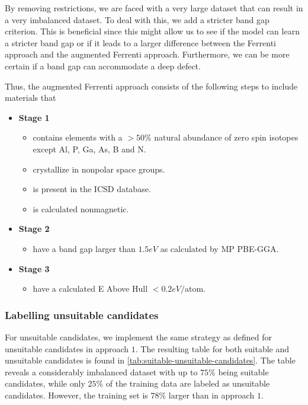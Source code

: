 By removing restrictions, we are faced with a very large dataset that can result in a very imbalanced dataset. To deal with this, we add a stricter band gap criterion. This is beneficial since this might allow us to see if the model can learn a stricter band gap or if it leads to a larger difference between the Ferrenti approach and the augmented Ferrenti approach. Furthermore, we can be more certain if a band gap can accommodate a deep defect. %

Thus, the augmented Ferrenti approach consists of the following steps to include materials that

\begin{itemize}
  \item[]{\textbf{Stage 1}}
  \begin{itemize}
  \item contains elements with a $>50\%$ natural abundance of zero spin isotopes except Al, P, Ga, As, B and N.
  \item crystallize in nonpolar space groups.
  \item is present in the ICSD database.
  \item is calculated nonmagnetic.
  \end{itemize}
  \item[]{\textbf{Stage 2}}
  \begin{itemize}
  \item have a band gap larger than $1.5eV$ as calculated by MP PBE-GGA.
  \end{itemize}
  \item[]{\textbf{Stage 3}}
  \begin{itemize}
  \item have a calculated E Above Hull $<0.2eV/$atom.
  \end{itemize}
\end{itemize}

\subsubsection{Labelling unsuitable candidates}

For unsuitable candidates, we implement the same strategy as defined for unsuitable candidates in approach $1$. The resulting table for both suitable and unsuitable candidates is found in \autoref{tab:suitable-unsuitable-candidates}. The table reveals a considerably imbalanced dataset with up to $75 \%$ being suitable candidates, while only $25 \%$ of the training data are labeled as unsuitable candidates. However, the training set is $78 \%$ larger than in approach $1$.

